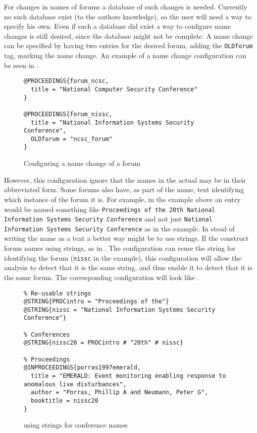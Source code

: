 For changes in names of forums a database of such changes is needed.
Currently no such database exist (to the authors knowledge), so the
user will need a way to specify his own.  Even if such a database did
exist a way to configure name changes is still desired, since the
database might not be complete.  A name change can be specified by
having two entries for the desired forum, adding the \texttt{OLDforum}
tag, marking the name change.  An example of a name change
configuration can be seen in
.

\begin{figure}
  \centering
\begin{verbatim}
@PROCEEDINGS{forum_ncsc,
  title = "National Computer Security Conference"
}

@PROCEEDINGS{forum_nissc,
  title = "National Information Systems Security Conference",
  OLDforum = "ncsc_forum"
}
\end{verbatim}
  \caption{Configuring a name change of a forum}
  \label{fig:analyzing_configuration_name_change}
\end{figure}

However, this configuration ignore that the names in the actual
 may be in their abbreviated form.  Some forums also have,
as part of the name, text identifying which instance of the forum it
is.  For example, in the example above an entry would be named
something like \texttt{Proceedings of the 20th National Information
  Systems Security Conference} and not just \texttt{National
  Information Systems Security Conference} as in the example.  In
stead of writing the name as a text a better way might be to use
strings.  If the  construct forum names using strings, as in
.
The configuration can reuse the string for identifying the forum
(\texttt{nissc} in the example), this configuration will allow the
analysis to detect that it is the same string, and thus enable it to
detect that it is the same forum.  The corresponding configuration
will look like
.

\begin{figure}
  \centering
\begin{small}
\begin{verbatim}
% Re-usable strings
@STRING{PROCintro = "Proceedings of the"}
@STRING{nissc = "National Information Systems Security Conference"}

% Conferences
@STRING{nissc20 = PROCintro # "20th" # nissc}

% Proceedings
@INPROCEEDINGS{porras1997emerald,
  title = "EMERALD: Event monitoring enabling response to anomalous live disturbances",
  author = "Porras, Phillip A and Neumann, Peter G",
  booktitle = nissc20
}
\end{verbatim}
\end{small}
  \caption{ using strings for conference names}
  \label{fig:analyzing_configuration_name_change_bib_file_strings}
\end{figure}


